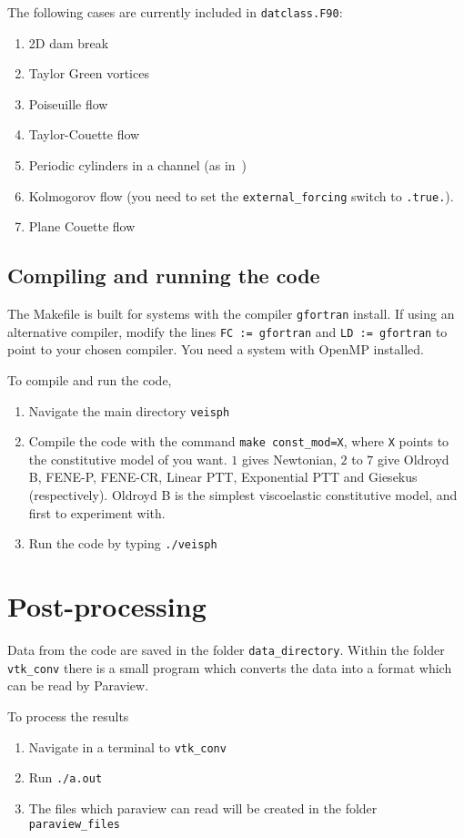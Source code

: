 \documentclass[notitlepage]{revtex4-2}
\begin{document}
The following cases are currently included in \verb|datclass.F90|:
\begin{enumerate}
\item 2D dam break
\item Taylor Green vortices
\item Poiseuille flow
\item Taylor-Couette flow
\item Periodic cylinders in a channel (as in~\cite{vazquez_2012})
\item Kolmogorov flow (you need to set the \verb|external_forcing| switch to \verb|.true.|).
\item Plane Couette flow
\end{enumerate}

\subsection{Compiling and running the code}

The Makefile is built for systems with the compiler \verb|gfortran| install. If using an alternative compiler, modify the lines \verb|FC := gfortran| and \verb|LD := gfortran| to point to your chosen compiler. You need a system with OpenMP installed.

To compile and run the code,
\begin{enumerate}
\item Navigate the main directory \verb|veisph|
\item Compile the code with the command \verb|make const_mod=X|, where \verb|X| points to the constitutive model of you want. $1$ gives Newtonian, $2$ to $7$ give Oldroyd B, FENE-P, FENE-CR, Linear PTT, Exponential PTT and Giesekus (respectively). Oldroyd B is the simplest viscoelastic constitutive model, and first to experiment with.
\item Run the code by typing \verb|./veisph|
\end{enumerate}

\section{Post-processing}

Data from the code are saved in the folder \verb|data_directory|. Within the folder \verb|vtk_conv| there is a small program which converts the data into a format which can be read by Paraview. 

To process the results
\begin{enumerate}
\item Navigate in a terminal to \verb|vtk_conv|
\item Run \verb|./a.out|
\item The files which paraview can read will be created in the folder \verb|paraview_files|
\end{enumerate}
\end{document}
